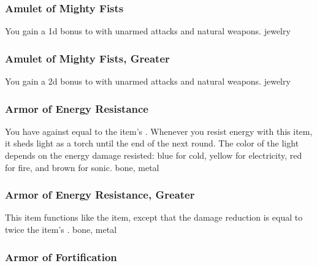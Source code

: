 \lowercase{\hypertarget{item:Amulet of Mighty Fists}{}}\label{item:Amulet of Mighty Fists}
\hypertarget{item:Amulet of Mighty Fists}{\subsubsection{Amulet of Mighty Fists\hfill{}}}
You gain a \plus1d bonus to  with unarmed attacks and natural weapons.
 
 jewelry
\lowercase{\hypertarget{item:Amulet of Mighty Fists, Greater}{}}\label{item:Amulet of Mighty Fists, Greater}
\hypertarget{item:Amulet of Mighty Fists, Greater}{\subsubsection{Amulet of Mighty Fists, Greater\hfill{}}}
You gain a \plus2d bonus to  with unarmed attacks and natural weapons.
 
 jewelry
\lowercase{\hypertarget{item:Armor of Energy Resistance}{}}\label{item:Armor of Energy Resistance}
\hypertarget{item:Armor of Energy Resistance}{\subsubsection{Armor of Energy Resistance\hfill{}}}
You have  against  equal to the item's .
Whenever you resist energy with this item, it sheds light as a torch until the end of the next round.
The color of the light depends on the energy damage resisted: blue for cold, yellow for electricity, red for fire, and brown for sonic.
 
 bone, metal
\lowercase{\hypertarget{item:Armor of Energy Resistance, Greater}{}}\label{item:Armor of Energy Resistance, Greater}
\hypertarget{item:Armor of Energy Resistance, Greater}{\subsubsection{Armor of Energy Resistance, Greater\hfill{}}}
This item functions like the  item, except that the damage reduction is equal to twice the item's .
 
 bone, metal
\lowercase{\hypertarget{item:Armor of Fortification}{}}\label{item:Armor of Fortification}
\hypertarget{item:Armor of Fortification}{\subsubsection{Armor of Fortification\hfill{}}}
